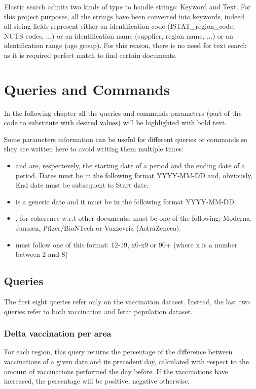 \documentclass{article}
\begin{document}
\hfill\break
Elastic search admits two kinds of type to handle strings: Keyword and Text.
For this project purposes, all the strings have been converted into keywords, indeed all string fields represent either an identification code (ISTAT\_region\_code, NUTS codes, ...) or an identification name (supplier, region name, ...) or an identification range (age group).
For this reason, there is no need for text search as it is required perfect match to find certain documents.

\newpage
\section{Queries and Commands}
In the following chapter all the queries and commands parameters (part of the code to substitute with desired values) will be highlighted with {\color{magenta}{magenta}} bold text.

Some parameters information can be useful for different queries or commands so they are written here to avoid writing them multiple times:
\begin{itemize}
    \item {\color{magenta}{Start date}} and {\color{magenta}{End date}} are, respectevely, the starting date of a period and the ending date of a period. Dates must be in the following format YYYY-MM-DD and, obviously, End date must be subsequent to Start date.
    \item {\color{magenta}{Date}} is a generic date and it must be in the following format YYYY-MM-DD.
    \item {\color{magenta}{Supplier}}, for coherence w.r.t other documents, must be one of the following: Moderna, Janssen, Pfizer/BioNTech or Vaxzevria (AstraZeneca).
    \item {\color{magenta}{Age range}} must follow one of this format: 12-19, x0-x9 or 90+ (where x is a number between 2 and 8)
\end{itemize}
\subsection{Queries}
The first eight queries refer only on the vaccination dataset. Instead, the last two queries refer to both vaccination and Istat population dataset.
\subsubsection{Delta vaccination per area}
For each region, this query returns the percentage of the difference between vaccinations of a given date and its precedent day, calculated with respect to the amount of vaccinations performed the day before.
If the vaccinations have increased, the percentage will be positive, negative otherwise.
\end{document}
